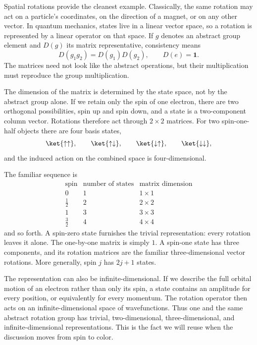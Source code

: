 Spatial rotations provide the cleanest example. Classically, the same rotation
may act on a particle's coordinates, on the direction of a magnet, or on any
other vector. In quantum mechanics, states live in a linear vector space, so a
rotation is represented by a linear operator on that space. If \(g\) denotes
an abstract group element and \(D(g)\) its matrix representative, consistency
means
\begin{equation}
D(g_1g_2)=D(g_1)D(g_2),
\qquad
D(e)=\boldsymbol 1.
\end{equation}
The matrices need not look like the abstract operations, but their
multiplication must reproduce the group multiplication.

The dimension of the matrix is determined by the state space, not by the
abstract group alone. If we retain only the spin of one electron, there are two
orthogonal possibilities, spin up and spin down, and a state is a two-component
column vector. Rotations therefore act through \(2\times2\) matrices. For two
spin-one-half objects there are four basis states,
\begin{equation}
\ket{\uparrow\uparrow},\qquad
\ket{\uparrow\downarrow},\qquad
\ket{\downarrow\uparrow},\qquad
\ket{\downarrow\downarrow},
\end{equation}
and the induced action on the combined space is four-dimensional.

The familiar sequence is
\begin{equation}
\begin{array}{c|c|c}
\text{spin} & \text{number of states} & \text{matrix dimension}\\
\hline
0 & 1 & 1\times1\\
\frac12 & 2 & 2\times2\\
1 & 3 & 3\times3\\
\frac32 & 4 & 4\times4
\end{array}
\end{equation}
and so forth. A spin-zero state furnishes the trivial representation: every
rotation leaves it alone. The one-by-one matrix is simply \(1\). A spin-one
state has three components, and its rotation matrices are the familiar
three-dimensional vector rotations. More generally, spin \(j\) has \(2j+1\)
states.

The representation can also be infinite-dimensional. If we describe the full
orbital motion of an electron rather than only its spin, a state contains an
amplitude for every position, or equivalently for every momentum. The rotation
operator then acts on an infinite-dimensional space of wavefunctions. Thus one
and the same abstract rotation group has trivial, two-dimensional,
three-dimensional, and infinite-dimensional representations. This is the fact
we will reuse when the discussion moves from spin to color.

